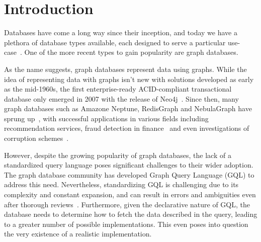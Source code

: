 \documentclass[14pt]{constructor-thesis}
\theoremstyle{definition}
\begin{document}
\maketitle
\tableofcontents
\section*{Introduction}

Databases have come a long way since their inception, and today we have a plethora of database types available, each designed to serve a particular use-case~\cite{database-types}. One of the more recent types to gain popularity are graph databases.

As the name suggests, graph databases represent data using graphs. While the idea of representing data with graphs isn't new with solutions developed as early as the mid-1960s, the first enterprise-ready ACID-compliant transactional database only emerged in 2007 with the release of Neo4j~\cite{enwiki:1146498781}. Since then, many graph databases such as Amazone Neptune, RedisGraph and NebulaGraph have sprung up~\cite{enwiki:1146498781}, with successful applications in various fields including recommendation services, fraud detection in finance~\cite{neo4j:use-cases} and even investigations of corruption schemes~\cite{icij:offshoreleaks}.

However, despite the growing popularity of graph databases, the lack of a standardized query language poses significant challenges to their wider adoption. The graph database community has developed Graph Query Language (GQL) to address this need. Nevertheless, standardizing GQL is challenging due to its complexity and constant expansion, and can result in errors and ambiguities even after thorough reviews~\cite{cpp-std-verified}. Furthermore, given the declarative nature of GQL, the database needs to determine how to fetch the data described in the query, leading to a greater number of possible implementations. This even poses into question the very existence of a realistic implementation.
\end{document}
